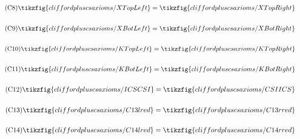 \begin{figure}[ht]
{{\begin{minipage}{.975\textwidth}
\begin{center}
\begin{subfigure}{0.38\textwidth}
        \end{subfigure}
        \begin{subfigure}{0.57\textwidth}
            \begin{align}\label{cs-C8}\tag{C8}\tikzfig{cliffordpluscsaxioms/XTopLeft}=\tikzfig{cliffordpluscsaxioms/XTopRight}\end{align}
        \end{subfigure}
        \begin{subfigure}{0.57\textwidth}
            \begin{align}\label{cs-C9}\tag{C9}\tikzfig{cliffordpluscsaxioms/XBotLeft}=\tikzfig{cliffordpluscsaxioms/XBotRight}\end{align}
        \end{subfigure}
        \begin{subfigure}{0.59\textwidth}
            \begin{align}\label{cs-C10}\tag{C10}\tikzfig{cliffordpluscsaxioms/KTopLeft}=\tikzfig{cliffordpluscsaxioms/KTopRight}\end{align}
        \end{subfigure}
        \begin{subfigure}{0.59\textwidth}
            \begin{align}\label{cs-C11}\tag{C11}\tikzfig{cliffordpluscsaxioms/KBotLeft}=\tikzfig{cliffordpluscsaxioms/KBotRight}\end{align}
        \end{subfigure}
        \begin{subfigure}{0.37\textwidth}
            \begin{align}\label{cs-C12}\tag{C12}\tikzfig{cliffordpluscsaxioms/ICSCSI}=\tikzfig{cliffordpluscsaxioms/CSIICS}\end{align}
        \end{subfigure}
        \begin{subfigure}{0.59\textwidth}
            \begin{align}\label{cs-C13}\tag{C13}\tikzfig{cliffordpluscsaxioms/C13lred}=\tikzfig{cliffordpluscsaxioms/C13rred}\end{align}
        \end{subfigure}
        \begin{subfigure}{0.67\textwidth}
            \begin{align}\label{cs-C14-old}\tag{C14}\tikzfig{cliffordpluscsaxioms/C14lred}=\tikzfig{cliffordpluscsaxioms/C14rred}\end{align}
        \end{subfigure}

\end{center}
\end{minipage}}}
\end{figure}
